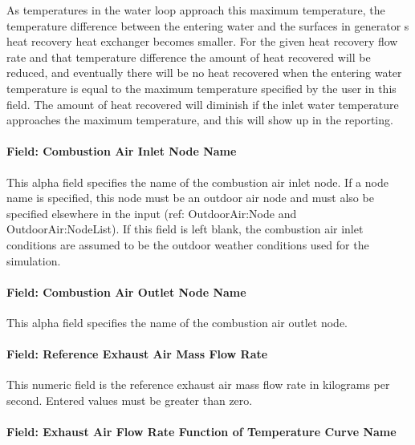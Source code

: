 As temperatures in the water loop approach this maximum temperature, the temperature difference between the entering water and the surfaces in generator s heat recovery heat exchanger becomes smaller. For the given heat recovery flow rate and that temperature difference the amount of heat recovered will be reduced, and eventually there will be no heat recovered when the entering water temperature is equal to the maximum temperature specified by the user in this field. The amount of heat recovered will diminish if the inlet water temperature approaches the maximum temperature, and this will show up in the reporting.

\paragraph{Field: Combustion Air Inlet Node Name}\label{field-combustion-air-inlet-node-name}

This alpha field specifies the name of the combustion air inlet node. If a node name is specified, this node must be an outdoor air node and must also be specified elsewhere in the input (ref: OutdoorAir:Node and OutdoorAir:NodeList). If this field is left blank, the combustion air inlet conditions are assumed to be the outdoor weather conditions used for the simulation.

\paragraph{Field: Combustion Air Outlet Node Name}\label{field-combustion-air-outlet-node-name}

This alpha field specifies the name of the combustion air outlet node.

\paragraph{Field: Reference Exhaust Air Mass Flow Rate}\label{field-reference-exhaust-air-mass-flow-rate}

This numeric field is the reference exhaust air mass flow rate in kilograms per second. Entered values must be greater than zero.

\paragraph{Field: Exhaust Air Flow Rate Function of Temperature Curve Name}\label{field-exhaust-air-flow-rate-function-of-temperature-curve-name}

